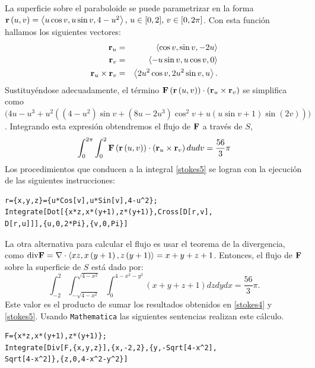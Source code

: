 La superficie sobre el paraboloide se puede parametrizar en la forma
${\bf r}\left(u,v\right) =\left\langle u\cos v,u\sin v,4-u^{2}\right\rangle,\, u\in [0,2],\, v\in \lbrack 0,2\pi ]$.
Con esta función hallamos los siguientes vectores:
\begin{eqnarray*}
{\bf r}_{u}&=& \left\langle \cos v,\sin v,-2u\right\rangle \\
{\bf r}_{v} &=& \left\langle -u\sin v,u\cos v,0\right\rangle \\
{\bf r}_{u}\times {\bf r}_{v} &=& \left\langle 2u^{2}\cos v,2u^{2}\sin v,u\right\rangle.
\end{eqnarray*}
Sustituyéndose adecuadamente, el término ${\bf F}\left({\bf r}\left(u,v\right)\right) \cdot \left({\bf r}_{u}\times {\bf r}_{v}\right)$ se simplifica como
$\big(4u-u^{3}+u^{2}((4-u^{2}) \sin v+(8u-2u^{3})\cos^{2}v +u(u\sin v+1) \sin (2v))\big)$.
Integrando esta expresión obtendremos el flujo de ${\bf F}$ a través de $S$,
\begin{equation} \label{stokes5}
\int_{0}^{2\pi }\int_{0}^{2}{\bf F}\left({\bf r}\left(u,v\right)\right) \cdot \left({\bf r}_{u}\times {\bf r}_{v}\right) dudv= \frac{56}{3}\pi
\end{equation}
Los procedimientos que conducen a la integral \ref{stokes5} se logran con la ejecución de las siguientes instrucciones:

\begin{tcolorbox}[title=\bf Instrucción \verb"Mathematica"]\begin{Verbatim}[formatcom=\letraverbatim]
r={x,y,z}={u*Cos[v],u*Sin[v],4-u^2};
Integrate[Dot[{x*z,x*(y+1),z*(y+1)},Cross[D[r,v],
D[r,u]]],{u,0,2*Pi},{v,0,Pi}]
\end{Verbatim}
\end{tcolorbox}

La otra alternativa para calcular el flujo es usar el teorema de la divergencia, como ${\rm div}{\bf F}=\nabla \cdot \left\langle xz,x\left( y+1\right) ,z\left( y+1\right) \right\rangle = x+y+z+1$.
Entonces, el flujo de ${\bf F}$ sobre la superficie de $S$ está dado por:
\[\int_{-2}^{2}\int_{-\sqrt{4-x^{2}}}^{\sqrt{4-x^{2}}}\int_{0}^{4-x^{2}-y^{2}}\left( x+y+z+1\right) dzdydx= \frac{56}{3}\pi.\]
Este valor es el producto de sumar los resultados obtenidos en \ref{stokes4} y \ref{stokes5}.
Usando \verb"Mathematica" las siguientes sentencias realizan este cálculo.

\begin{tcolorbox}[title=\bf Instrucción \verb"Mathematica"]\begin{Verbatim}[formatcom=\letraverbatim]
F={x*z,x*(y+1),z*(y+1)};
Integrate[Div[F,{x,y,z}],{x,-2,2},{y,-Sqrt[4-x^2],
Sqrt[4-x^2]},{z,0,4-x^2-y^2}]
\end{Verbatim}
\end{tcolorbox}

